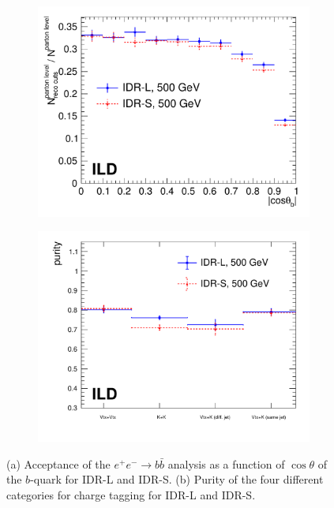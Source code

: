 \begin{figure}[htbp]
\begin{subfigure}{0.49\hsize} 
\includegraphics[width=\textwidth]{Performance/fig/acceptance_2models_v2.pdf}
 \caption{ \label{fig:bbbar:effipur:effi}}
 \end{subfigure}
\begin{subfigure}{0.49\hsize} 
\includegraphics[width=\textwidth]{Performance/fig/purity_v3.pdf}
 \caption{  \label{fig:bbbar:effipur:pur}}
 \end{subfigure}
\caption{
(a) Acceptance of the $e^+e^- \to b\bar{b}$ analysis as a function of $\cos{\theta}$ of the $b$-quark for IDR-L and IDR-S.
(b) Purity of the four different categories for charge tagging for IDR-L and IDR-S. 
}
\label{fig:bbbar:effipur}
\end{figure}

